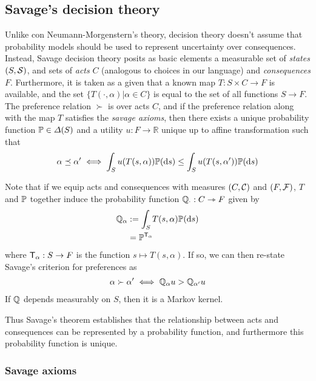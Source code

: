 \subsection{Savage's decision theory}

Unlike con Neumann-Morgenstern's theory, \citet{savage_foundations_1954} decision theory doesn't assume that probability models should be used to represent uncertainty over consequences. Instead, Savage decision theory posits as basic elements a measurable set of \emph{states} $(S,\mathcal{S})$, and sets of \emph{acts} $C$ (analogous to choices in our language) and \emph{consequences} $F$. Furthermore, it is taken as a given that a known map $T:S\times C\to F$ is available, and the set $\{T(\cdot,\alpha)|\alpha\in C\}$ is equal to the set of all functions $S\to F$. The preference relation $\succ$ is over acts $C$, and if the preference relation along with the map $T$ satisfies the \emph{savage axioms}, then there exists a unique probability function $\mathbb{P}\in \Delta(S)$ and a utility $u:F\to \mathbb{R}$ unique up to affine transformation such that
\begin{align}
    \alpha\preceq \alpha' \iff \int_S u(T(s,\alpha))\mathbb{P}(\mathrm{d}s) \leq \int_S u(T(s,\alpha'))\mathbb{P}(\mathrm{d}s)
\end{align}

Note that if we equip acts and consequences with measures $(C,\mathcal{C})$ and $(F,\mathcal{F})$, $T$ and $\mathbb{P}$ together induce the probability function $\mathbb{Q}_\cdot:C\rightarrowtriangle F$ given by
\begin{align}
    \mathbb{Q}_\alpha &:= \int_S T(s,\alpha)\mathbb{P}(\mathrm{d}s)\\
                    &=\mathbb{P}^{\mathsf{T}_\alpha}
\end{align}
where $\mathsf{T}_\alpha:S\to F$ is the function $s\mapsto T(s,\alpha)$. If so, we can then re-state Savage's criterion for preferences as
\begin{align}
    \alpha\succ \alpha' \iff \mathbb{Q}_\alpha u > \mathbb{Q}_{\alpha'} u
\end{align}
 If $\mathbb{Q}$ depends measurably on $S$, then it is a Markov kernel.


Thus Savage's theorem establishes that the relationship between acts and consequences can be represented by a probability function, and furthermore this probability function is unique. 

\subsubsection{Savage axioms}

